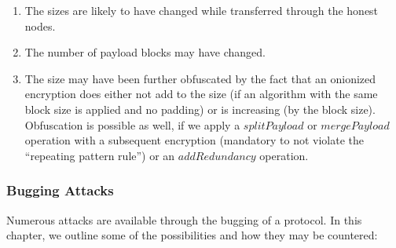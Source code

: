 \begin{enumerate}
	\item The sizes are likely to have changed while transferred through the honest nodes.
	\item The number of payload blocks may have changed.
	\item The size may have been further obfuscated by the fact that an onionized encryption does either not add to the size (if an algorithm with the same block size is applied and no padding) or is increasing (by the block size). Obfuscation is possible as well, if we apply a $splitPayload$ or $mergePayload$ operation with a subsequent encryption (mandatory to not violate the ``repeating pattern rule'') or an $addRedundancy$ operation.
\end{enumerate}

\subsubsection{Bugging Attacks}
Numerous attacks are available through the bugging of a protocol. In this chapter, we outline some of the possibilities and how they may be countered:

